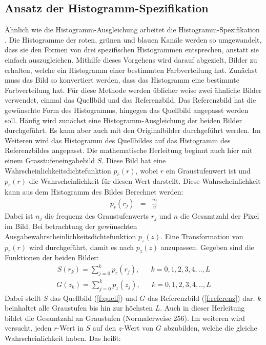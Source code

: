   \subsection{Ansatz der Histogramm-Spezifikation}\label{s.hs}
Ähnlich wie die Histogramm-Ausgleichung arbeitet die Histogramm-Spezifikation\\ \cite{goatman2003colour}. Die Histogramme der roten, grünen und blauen Kanäle werden so umgewandelt, dass sie den Formen von drei spezifischen Histogrammen entsprechen, anstatt sie einfach auszugleichen. Mithilfe dieses Vorgehens wird darauf abgezielt, Bilder zu erhalten, welche ein Histogramm einer bestimmten Farbverteilung hat. Zunächst muss das Bild so konvertiert werden, dass das Histogramm eine bestimmte Farbverteilung hat. Für diese Methode werden üblicher weise zwei ähnliche Bilder verwendet, einmal das Quellbild und das Referenzbild. Das Referenzbild hat die gewünschte Form des Histogramms, hingegen das Quellbild angepasst werden soll. Häufig wird zunächst eine Histogramm-Ausgleichung der beiden Bilder durchgeführt. Es kann aber auch mit den Originalbilder durchgeführt werden. Im Weiteren wird das Histogramm des Quellbildes auf das Histogramm des Referenzbildes angepasst. Die mathematische Herleitung beginnt auch hier mit einem Grasstufeneingabebild $S$. 
Diese Bild hat eine Wahrscheinlichkeitsdichtefunktion $p_{r}(r)$, wobei $r$ ein Graustufenwert ist und $p_{r}(r)$ die Wahrscheinlichkeit für diesen Wert darstellt. Diese Wahrscheinlichkeit kann aus dem Histogramm des Bildes Berechnet werden:
\begin{eqnarray} p_{r}(r_{j})&=&\frac{n_{j}}{n} \end{eqnarray}
Dabei ist $n_{j}$ die frequenz des Graustufenwerts $r_{j}$ und $n$ die Gesamtzahl der Pixel im Bild. Bei betrachtung der gewünschten Ausgabewahrscheinlichkeitsdichtefunktion $p_{z}(z)$. Eine Transformation von $p_{r}(r)$ wird durchgeführt, damit es nach $p_{z}(z)$ anzupassen. Gegeben sind die Funktionen der beiden Bilder: 
\begin{align} \label{f:quell} S(r_{k})=\sum_{j=0}^k p_{r}(r_{j}) ,& &k=0,1,2,3,4,..,L\end{align}
\begin{align} \label{f:referenz} G(z_{k})=\sum_{j=0}^k p_{z}(z_{j}) ,& &k=0,1,2,3,4,.., L \end{align}
Dabei stellt $S$ das Quellbild (\ref{f:quell}) und $G$ das Referenzbild (\ref{f:referenz}) dar. $k$ beinhaltet alle Graustufen bis hin zur höchsten $L$.   
Auch in dieser Herleitung bildet die Gesamtzahl an Graustufen (Normalerweise 256). Im weiteren wird versucht, jeden $r$-Wert in $S$ auf den $z$-Wert von $G$ abzubilden, welche die gleiche Wahrscheinlichkeit haben. Das heißt:
